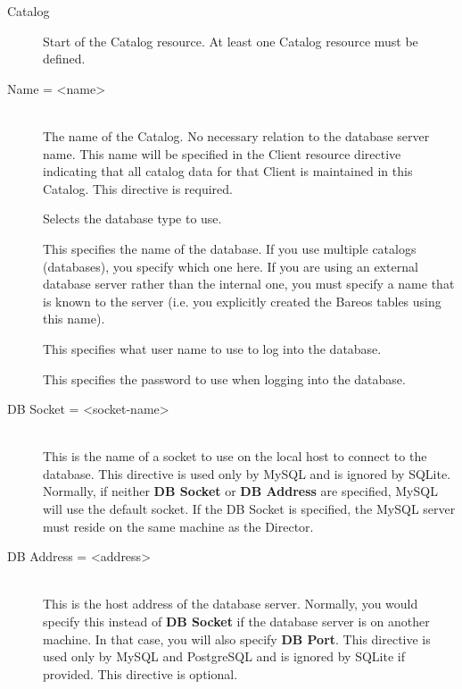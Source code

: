 \begin{description}

\item [Catalog]
Start of the Catalog resource.  At least one Catalog resource must be
defined.

\item [Name = {\textless}name{\textgreater}] \hfill \\
The name of the Catalog.  No necessary relation to the database server
name.  This name will be specified in the Client resource directive
indicating that all catalog data for that Client is maintained in this
Catalog.  This directive is required.

Selects the database type to use.

This specifies the name of the database.  If you use multiple catalogs
(databases), you specify which one here.  If you are using an external
database server rather than the internal one, you must specify a name
that is known to the server (i.e.  you explicitly created the Bareos
tables using this name).

This specifies what user name to use to log into the database.

This specifies the password to use when logging into the database.


\item [DB Socket = {\textless}socket-name{\textgreater}] \hfill \\
This is the name of  a socket to use on the local host to connect to the
database. This directive is used only by MySQL and is ignored by  SQLite.
Normally, if neither {\bf DB Socket} or {\bf DB Address}  are specified, MySQL
will use the default socket. If the DB Socket is specified, the
MySQL server must reside on the same machine as the Director.

\item [DB Address = {\textless}address{\textgreater}] \hfill \\
This is the host address  of the database server. Normally, you would specify
this instead  of {\bf DB Socket} if the database server is on another machine.
In that case, you will also specify {\bf DB Port}. This directive  is used
only by MySQL and PostgreSQL and is ignored by SQLite if provided.
This directive is optional.


\end{description}
